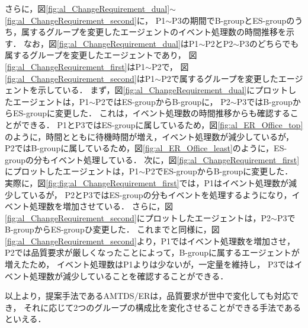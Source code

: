 \documentclass[12pt,a4j,twoside]{jarticle}
\begin{document}
  さらに，図\ref{fig:al_ChangeRequirement_dual}$\sim$\ref{fig:al_ChangeRequirement_second}に，
  P1$\sim$P3の期間でB-groupとES-groupのうち，属するグループを変更したエージェントのイベント処理数の時間推移を示す．
  なお，図\ref{fig:al_ChangeRequirement_dual}はP1$\sim$P2とP2$\sim$P3のどちらでも属するグループを変更したエージェントであり，
  図\ref{fig:al_ChangeRequirement_first}はP1$\sim$P2で，
  図\ref{fig:al_ChangeRequirement_second}はP1$\sim$P2で属するグループを変更したエージェントを示している．
  まず，図\ref{fig:al_ChangeRequirement_dual}にプロットしたエージェントは，P1$\sim$P2ではES-groupからB-groupに，
  P2$\sim$P3ではB-groupからES-groupに変更した．
  これは，イベント処理数の時間推移からも確認することができる．
  P1とP3ではES-groupに属しているため，図\ref{fig:al_ER_Office_top}のように，時間とともに待機時間が増え，イベント処理数が減少しているが，
  P2ではB-groupに属しているため，図\ref{fig:al_ER_Office_least}のように，ES-groupの分もイベント処理している．
  次に，図\ref{fig:al_ChangeRequirement_first}にプロットしたエージェントは，P1$\sim$P2でES-groupからB-groupに変更した．
  実際に，図\ref{fig:fig:al_ChangeRequirement_first}では，P1はイベント処理数が減少しているが，
  P2とP3ではES-groupの分もイベントを処理するようになり，イベント処理数を増加させている．
  さらに，図\ref{fig:al_ChangeRequirement_second}にプロットしたエージェントは，P2$\sim$P3でB-groupからES-groupひ変更した．
  これまでと同様に，図\ref{fig:al_ChangeRequirement_second}より，P1ではイベント処理数を増加させ，
  P2では品質要求が厳しくなったことによって，B-groupに属するエージェントが増えたため，
  イベント処理数はP1よりは少ないが，一定量を維持し，
  P3ではイベント処理数が減少していることを確認することができる．
  \par

  以上より，提案手法であるAMTDS/ERは，品質要求が世中で変化しても対応でき，
  それに応じて2つのグループの構成比を変化させることができる手法であるといえる．
\end{document}

